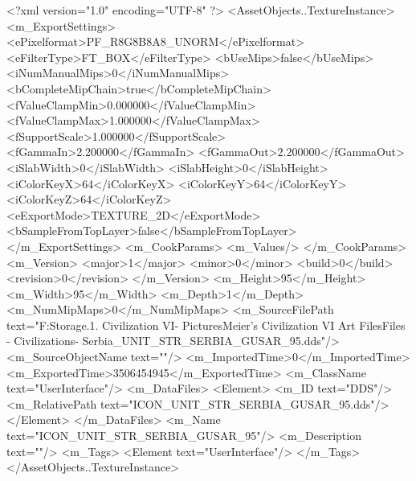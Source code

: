 <?xml version="1.0" encoding="UTF-8" ?>
<AssetObjects..TextureInstance>
	<m_ExportSettings>
		<ePixelformat>PF_R8G8B8A8_UNORM</ePixelformat>
		<eFilterType>FT_BOX</eFilterType>
		<bUseMips>false</bUseMips>
		<iNumManualMips>0</iNumManualMips>
		<bCompleteMipChain>true</bCompleteMipChain>
		<fValueClampMin>0.000000</fValueClampMin>
		<fValueClampMax>1.000000</fValueClampMax>
		<fSupportScale>1.000000</fSupportScale>
		<fGammaIn>2.200000</fGammaIn>
		<fGammaOut>2.200000</fGammaOut>
		<iSlabWidth>0</iSlabWidth>
		<iSlabHeight>0</iSlabHeight>
		<iColorKeyX>64</iColorKeyX>
		<iColorKeyY>64</iColorKeyY>
		<iColorKeyZ>64</iColorKeyZ>
		<eExportMode>TEXTURE_2D</eExportMode>
		<bSampleFromTopLayer>false</bSampleFromTopLayer>
	</m_ExportSettings>
	<m_CookParams>
		<m_Values/>
	</m_CookParams>
	<m_Version>
		<major>1</major>
		<minor>0</minor>
		<build>0</build>
		<revision>0</revision>
	</m_Version>
	<m_Height>95</m_Height>
	<m_Width>95</m_Width>
	<m_Depth>1</m_Depth>
	<m_NumMipMaps>0</m_NumMipMaps>
	<m_SourceFilePath text="F:\Mod Storage\2.1. Civilization VI\Mods\Archive - Pictures\Sid Meier's Civilization VI Art Files\Art Files - Civilizations\Civilization - Serbia\ICON_UNIT_STR_SERBIA_GUSAR_95.dds"/>
	<m_SourceObjectName text=""/>
	<m_ImportedTime>0</m_ImportedTime>
	<m_ExportedTime>3506454945</m_ExportedTime>
	<m_ClassName text="UserInterface"/>
	<m_DataFiles>
		<Element>
			<m_ID text="DDS"/>
			<m_RelativePath text="ICON_UNIT_STR_SERBIA_GUSAR_95.dds"/>
		</Element>
	</m_DataFiles>
	<m_Name text="ICON_UNIT_STR_SERBIA_GUSAR_95"/>
	<m_Description text=""/>
	<m_Tags>
		<Element text="UserInterface"/>
	</m_Tags>
</AssetObjects..TextureInstance>

